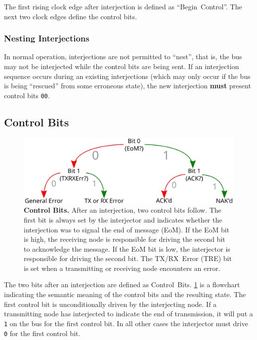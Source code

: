 The first rising clock edge after interjection is defined as ``Begin~Control''.
The next two clock edges define the control bits.

\subsubsection{Nesting Interjections}
In normal operation, interjections are not permitted to ``nest'', that is, the
bus may not be interjected while the control bits are being sent. If an
interjection sequence occurs during an existing interjections (which may only
occur if the bus is being ``rescued'' from some erroneous state), the new
interjection {\bf must} present control bits {\tt 00}.

\subsection{Control Bits}
\label{sec:protocol-control}

\begin{figure}
  \includegraphics[width=\linewidth]{img/control_bits}
  \caption{\textbf{Control Bits.} \textmd{
      After an interjection, two control bits follow. The first bit is always
      set by the interjector and indicates whether the interjection was to
      signal the end of message (EoM). If the EoM bit is high, the receiving
      node is responsible for driving the second bit to acknowledge the
      message.  If the EoM bit is low, the interjector is responsible for
      driving the second bit. The TX/RX~Error (TRE) bit is set when a
      transmitting or receiving node encounters an error.
  }}
  \label{fig:control-bits}
\end{figure}

The two bits after an interjection are defined as Control~Bits.
\cref{fig:control-bits} is a flowchart indicating the semantic meaning
of the control bits and the resulting state. The first control bit is
unconditionally driven by the interjecting node. If a transmitting node has
interjected to indicate the end of transmission, it will put a {\tt 1} on the
bus for the first control bit. In all other cases the interjector must drive
{\tt 0} for the first control bit.

